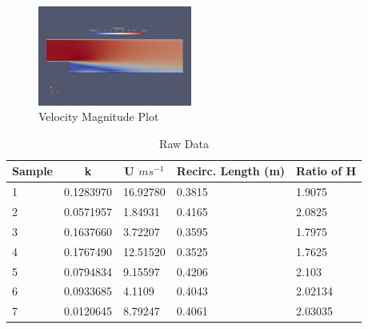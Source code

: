 \documentclass[conference]{IEEEtran}
\begin{document}
\begin{figure}[ht]
    \centering
    \includegraphics[width = 0.45\textwidth]{Images/result_example.png}
    \caption{Velocity Magnitude Plot}
    \label{fig:vmag}
\end{figure}

\begin{table}[ht]
\centering
\caption{Raw Data}
\begin{tabular}{|l|ll|ll|}
\hline
\multicolumn{1}{|c|}{Sample} & \multicolumn{1}{c}{k} & \multicolumn{1}{c|}{U $ms^{-1}$} & \multicolumn{1}{c}{Recirc. Length (m)} & \multicolumn{1}{c|}{Ratio of H} \\ \hline
1                            & 0.1283970                                   & 16.92780               & 0.3815                                     & 1.9075                          \\
2                            & 0.0571957                                   & 1.84931                & 0.4165                                     & 2.0825                          \\
3                            & 0.1637660                                   & 3.72207                & 0.3595                                     & 1.7975                          \\
4                            & 0.1767490                                   & 12.51520               & 0.3525                                     & 1.7625                          \\
5                            & 0.0794834                                   & 9.15597                & 0.4206                                     & 2.103                           \\
6                            & 0.0933685                                   & 4.1109                 & 0.4043                                     & 2.02134                         \\
7                            & 0.0120645                                   & 8.79247                & 0.4061                                     & 2.03035                         \\

\end{tabular}
\end{table}
\end{document}

